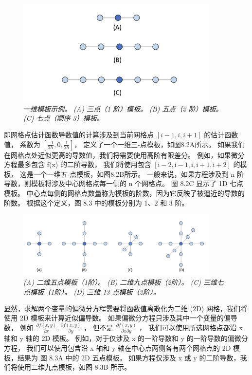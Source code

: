 \begin{figure}[H]
	\centering
	\includegraphics[width=0.9\textwidth]{figs/F8.2.png}
	\caption{\textit{一维模板示例。 (A) 三点（1 阶）模板。 (B) 五点（2 阶）模板。 (C) 七点（顺序 3）模板。}}
\end{figure}

即网格点估计函数导数值的计算涉及到当前网格点 $[i - 1, i, i + 1]$ 的估计函数值，
系数为 $\left[\frac{-1}{2 h}, 0, \frac{1}{2 h}\right]$，
定义了一个一维三-点模板，如图8.2A所示。 如果我们在网格点处近似更高的导数值，我们将需要使用高阶有限差分。 
例如，如果微分方程最多包含 f(x) 的二阶导数，
我们将使用包含 $[\mathrm{i}-2, \mathrm{i}-1, \mathrm{i}, \mathrm{i}+1, \mathrm{i}+2]$ 的模板，
这是一个一维五-点模板，如图8.2B所示。 一般来说，如果方程涉及到 n 阶导数，则模板将涉及中心网格点每一侧的 n 个网格点。 
图 8.2C 显示了 1D 七点模板。 中心点每侧的网格点数量称为模板的阶数，因为它反映了被逼近的导数的阶数。 
根据这个定义，图 8.3 中的模板分别为 1、2 和 3 阶。

\begin{figure}[H]
	\centering
	\includegraphics[width=0.9\textwidth]{figs/F8.3.png}
	\caption{\textit{(A) 二维五点模板（1阶）。 (B) 二维九点模板（2阶）。 (C) 三维七点模板（1阶）。 (D) 三维 13 点模板（2阶）。}}
\end{figure}

显然，求解两个变量的偏微分方程需要将函数值离散化为二维 (2D) 网格，我们将使用 2D 模板来计算近似偏导数。 
如果偏微分方程只涉及其中一个变量的偏导数，
例如 $\frac{\partial f(x, y)}{\partial x}, \frac{\partial f(x, y)}{\partial y}$ ，
但不是 $\frac{\partial f(x, y)}{\partial x \partial y}$ ，
我们可以使用所选网格点都沿 x 轴和 y 轴的 2D 模板。 例如，对于仅涉及 x 的一阶导数和 y 的一阶导数的偏微分方程，
我们可以使用包含沿 x 轴和 y 轴在中心点两侧各有两个网格点的 2D 模板，结果为 图 8.3A 中的 2D 五点模板。 
如果方程仅涉及 x 或 y 的二阶导数，我们将使用二维九点模板，如图 8.3B 所示。

